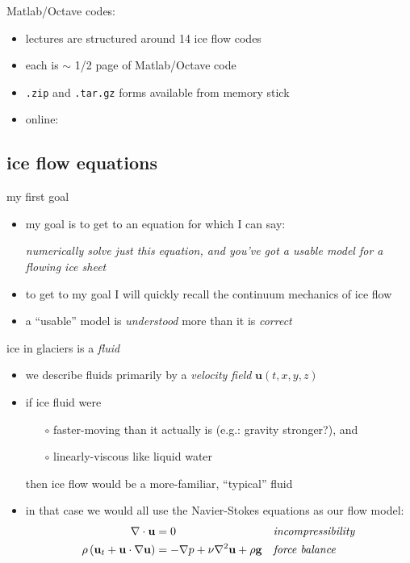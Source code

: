 \documentclass[titlepage,letterpaper,final,11pt]{scrartcl}
\begin{document}
\nocite{BLKCB,BBssasliding,Fowler,GreveBlatter2009,SchoofStream,SchoofMarine1}

Matlab/Octave codes:

\begin{itemize}
\item lectures are structured around 14 ice flow codes
\item each is $\sim$ 1/2 page of Matlab/Octave code
\item \texttt{.zip} and \texttt{.tar.gz} forms available from memory stick
\item online:

\centerline{}
\end{itemize}


\subsection{ice flow equations}


my first goal

\begin{itemize}
\item my goal is to get to an equation for which I can say:

\begin{center}
\emph{numerically solve just this equation, and you've got a usable model for a flowing ice sheet}
\end{center}

\item to get to my goal I will quickly recall the continuum mechanics of ice flow
\item a ``usable'' model is \emph{understood} more than it is \emph{correct}
\end{itemize}


ice in glaciers is a \emph{fluid}

\begin{itemize}
\item we describe fluids primarily by a \emph{velocity field} $\mathbf{u}(t,x,y,z)$
\item if ice fluid were
  \begin{itemize}
  \item[$\circ$] faster-moving than it actually is (e.g.: gravity stronger?), and
  \item[$\circ$] linearly-viscous like liquid water
  \end{itemize}
  
  then ice flow would be a more-familiar, ``typical'' fluid
\item in that case we would all use the Navier-Stokes equations as our flow model:
\begin{align*}
\nabla \cdot \mathbf{u} &= 0 &&\text{\emph{incompressibility}} \\
\rho \left(\mathbf{u}_t + \mathbf{u}\cdot\nabla \mathbf{u}\right) &= -\nabla p + \nu \nabla^2 \mathbf{u} + \rho \mathbf{g} &&\text{\emph{force balance}}
\end{align*}
\end{itemize}
\end{document}
